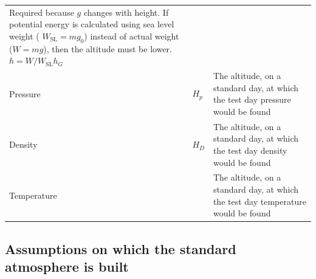 \documentclass[
]{book}
\begin{document}
\begin{longtable}[]{@{}lll@{}}
\begin{minipage}[t]{0.81\columnwidth}
Required because \(g\) changes with height. If potential energy is calculated using sea level weight ( \(W_{\mathrm{SL}} = mg_0\)) instead of actual weight (\(W = mg\)), then the altitude must be lower. \(h = W/W_{\mathrm{SL}} h_G\)\strut
\end{minipage}\tabularnewline
\begin{minipage}[t]{0.07\columnwidth}\raggedright
Pressure\strut
\end{minipage} & \begin{minipage}[t]{0.03\columnwidth}\raggedright
\(H_p\)\strut
\end{minipage} & \begin{minipage}[t]{0.81\columnwidth}\raggedright
The altitude, on a standard day, at which the test day pressure would be found\strut
\end{minipage}\tabularnewline
\begin{minipage}[t]{0.07\columnwidth}\raggedright
Density\strut
\end{minipage} & \begin{minipage}[t]{0.03\columnwidth}\raggedright
\(H_D\)\strut
\end{minipage} & \begin{minipage}[t]{0.81\columnwidth}\raggedright
The altitude, on a standard day, at which the test day density would be found\strut
\end{minipage}\tabularnewline
\begin{minipage}[t]{0.07\columnwidth}\raggedright
Temperature\strut
\end{minipage} & \begin{minipage}[t]{0.03\columnwidth}\raggedright
\strut
\end{minipage} & \begin{minipage}[t]{0.81\columnwidth}\raggedright
The altitude, on a standard day, at which the test day temperature would be found\strut
\end{minipage}\tabularnewline
\bottomrule
\end{longtable}

\hypertarget{assumptions-on-which-the-standard-atmosphere-is-built}{%
\subsection*{Assumptions on which the standard atmosphere is built}\label{assumptions-on-which-the-standard-atmosphere-is-built}}
\end{document}
